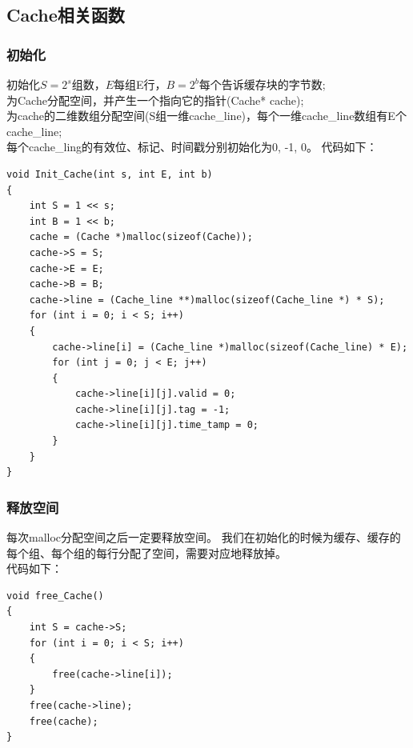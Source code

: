 \documentclass[12pt, a4paper, oneside]{ctexart}
\begin{document}
\subsection{Cache相关函数}
\subsubsection{初始化}
\noindent
初始化$S=2^s$组数，$E$每组E行，$B=2^b$每个告诉缓存块的字节数;\\
为Cache分配空间，并产生一个指向它的指针(Cache* cache);\\
为cache的二维数组分配空间(S组一维cache\_line)，每个一维cache\_line数组有E个cache\_line;\\
每个cache\_ling的有效位、标记、时间戳分别初始化为0, -1, 0。
代码如下：
\begin{lstlisting}
void Init_Cache(int s, int E, int b)
{
    int S = 1 << s;
    int B = 1 << b;
    cache = (Cache *)malloc(sizeof(Cache));
    cache->S = S;
    cache->E = E;
    cache->B = B;
    cache->line = (Cache_line **)malloc(sizeof(Cache_line *) * S);
    for (int i = 0; i < S; i++)
    {
        cache->line[i] = (Cache_line *)malloc(sizeof(Cache_line) * E);
        for (int j = 0; j < E; j++)
        {
            cache->line[i][j].valid = 0; 
            cache->line[i][j].tag = -1;
            cache->line[i][j].time_tamp = 0;
        }
    }
}
\end{lstlisting}
\subsubsection{释放空间}
\noindent
每次malloc分配空间之后一定要释放空间。
我们在初始化的时候为缓存、缓存的每个组、每个组的每行分配了空间，需要对应地释放掉。\\
代码如下：
\begin{lstlisting}
void free_Cache()
{
    int S = cache->S;
    for (int i = 0; i < S; i++)
    {
        free(cache->line[i]);
    }
    free(cache->line);
    free(cache);
}
\end{lstlisting}
\end{document}

